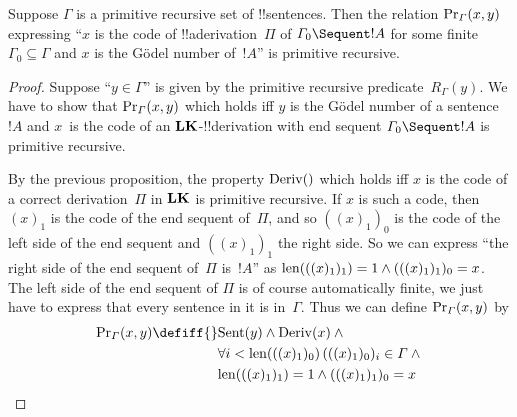 \documentclass[../../include/open-logic-section]{subfiles}
\begin{document}
\begin{prop}
Suppose $\Gamma$ is a primitive recursive set of !!{sentence}s.  Then
the relation $\mathrm{Pr}_\Gamma(x, y)$ expressing ``$x$ is the code of
!!a{derivation}~$\Pi$ of $\Gamma_0 \Sequent !A$ for some finite
$\Gamma_0 \subseteq \Gamma$ and $x$ is the G\"odel number of~$!A$'' is
primitive recursive.
\end{prop}

\begin{proof}
Suppose ``$y \in \Gamma$'' is given by the primitive recursive
predicate~$R_\Gamma(y)$.  We have to show that $\mathrm{Pr}_\Gamma(x, y)$
which holds iff $y$ is the G\"odel number of a sentence~$!A$ and
$x$~is the code of an $\mathbf{LK}$-!!{derivation} with end sequent
$\Gamma_0 \Sequent !A$ is primitive recursive.

By the previous proposition, the property $\mathrm{Deriv}()$ which holds
iff $x$ is the code of a correct derivation~$\Pi$ in $\mathbf{LK}$ is
primitive recursive.  If $x$ is such a code, then $(x)_1$ is the code
of the end sequent of~$\Pi$, and so $((x)_1)_0$ is the code of the
left side of the end sequent and $((x)_1)_1$ the right side.  So we can
express ``the right side of the end sequent of~$\Pi$ is~$!A$'' as
$\mathrm{len}(((x)_1)_1) = 1 \land (((x)_1)_1)_0 = x$.  The left side of the
end sequent of $\Pi$ is of course automatically finite, we just have
to express that every sentence in it is in~$\Gamma$.  Thus we can
define $\mathrm{Pr}_\Gamma(x, y)$ by
\begin{align*}
\fn{Pr}_\Gamma(x, y) \defiff {}&
\fn{Sent}(y) \land \fn{Deriv}(x) \land {} \\
& \lforall[i <
  \len{((x)_1)_0}][(((x)_1)_0)_i \in \Gamma] \land {}\\
& \len{((x)_1)_1} = 1 \land (((x)_1)_1)_0 = x
\end{align*}
\end{proof}
\end{document}
